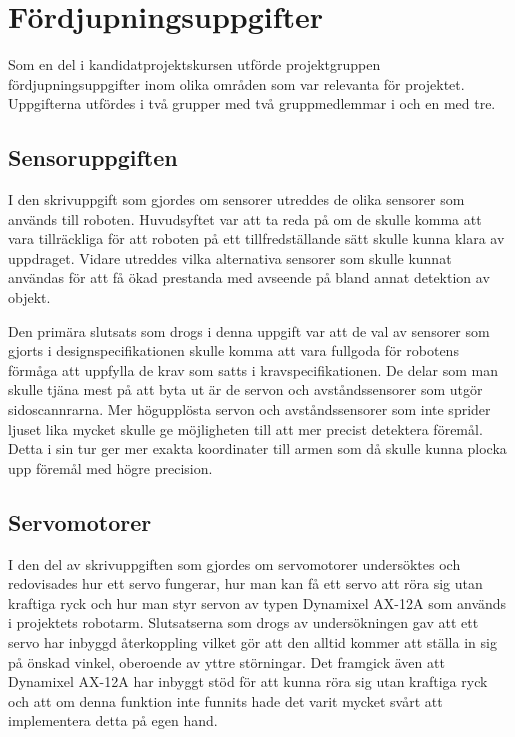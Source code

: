 

\section{Fördjupningsuppgifter}

Som en del i kandidatprojektskursen utförde projektgruppen fördjupningsuppgifter inom olika områden som var relevanta för projektet. Uppgifterna utfördes i två grupper med två gruppmedlemmar i och en med tre.

\subsection{Sensoruppgiften}

I den skrivuppgift som gjordes om sensorer utreddes de olika sensorer som används till roboten. Huvudsyftet var att ta reda på om de skulle komma att vara tillräckliga för att roboten på ett tillfredställande sätt skulle kunna klara av uppdraget. Vidare utreddes vilka alternativa sensorer som skulle kunnat användas för att få ökad prestanda med avseende på bland annat detektion av objekt. 

Den primära slutsats som drogs i denna uppgift var att de val av sensorer som gjorts i designspecifikationen skulle komma att vara fullgoda för robotens förmåga att uppfylla de krav som satts i kravspecifikationen. De delar som man skulle tjäna mest på att byta ut är de servon och avståndssensorer som utgör sidoscannrarna. Mer högupplösta servon och avståndssensorer som inte sprider ljuset lika mycket skulle ge möjligheten till att mer precist detektera föremål. Detta i sin tur ger mer exakta koordinater till armen som då skulle kunna plocka upp föremål med högre precision.

\subsection{Servomotorer}

I den del av skrivuppgiften som gjordes om servomotorer undersöktes och redovisades hur ett servo fungerar, hur man kan få ett servo att röra sig utan kraftiga ryck och hur man styr servon av typen Dynamixel AX-12A som används i projektets robotarm. Slutsatserna som drogs av undersökningen gav att ett servo har inbyggd återkoppling vilket gör att den alltid kommer att ställa in sig på önskad vinkel, oberoende av yttre störningar. Det framgick även att  Dynamixel AX-12A har inbyggt stöd för att kunna röra sig utan kraftiga ryck och att om denna funktion inte funnits hade det varit mycket svårt att implementera detta på egen hand. 


